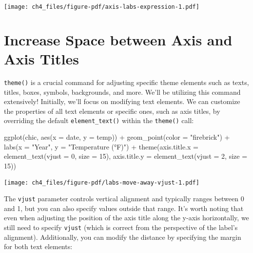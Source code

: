 \documentclass[
  letterpaper,
]{scrbook}
\newenvironment{Shaded}{\begin{snugshade}}{\end{snugshade}}
\newcommand{\AttributeTok}[1]{\textcolor[rgb]{0.40,0.45,0.13}{#1}}
\newcommand{\DecValTok}[1]{\textcolor[rgb]{0.68,0.00,0.00}{#1}}
\newcommand{\FunctionTok}[1]{\textcolor[rgb]{0.28,0.35,0.67}{#1}}
\newcommand{\NormalTok}[1]{\textcolor[rgb]{0.00,0.23,0.31}{#1}}
\newcommand{\SpecialCharTok}[1]{\textcolor[rgb]{0.37,0.37,0.37}{#1}}
\newcommand{\StringTok}[1]{\textcolor[rgb]{0.13,0.47,0.30}{#1}}
\begin{document}
\texttt{[image: ch4\_files/figure-pdf/axis-labs-expression-1.pdf]}

\section{Increase Space between Axis and Axis
Titles}\label{increase-space-between-axis-and-axis-titles}

\texttt{theme()} is a crucial command for adjusting specific theme
elements such as texts, titles, boxes, symbols, backgrounds, and more.
We'll be utilizing this command extensively! Initially, we'll focus on
modifying text elements. We can customize the properties of all text
elements or specific ones, such as axis titles, by overriding the
default \texttt{element\_text()} within the \texttt{theme()} call:

\begin{Shaded}
\begin{Highlighting}[]
\FunctionTok{ggplot}\NormalTok{(chic, }\FunctionTok{aes}\NormalTok{(}\AttributeTok{x =}\NormalTok{ date, }\AttributeTok{y =}\NormalTok{ temp)) }\SpecialCharTok{+}
  \FunctionTok{geom\_point}\NormalTok{(}\AttributeTok{color =} \StringTok{"firebrick"}\NormalTok{) }\SpecialCharTok{+}
  \FunctionTok{labs}\NormalTok{(}\AttributeTok{x =} \StringTok{"Year"}\NormalTok{, }\AttributeTok{y =} \StringTok{"Temperature (°F)"}\NormalTok{) }\SpecialCharTok{+}
  \FunctionTok{theme}\NormalTok{(}\AttributeTok{axis.title.x =} \FunctionTok{element\_text}\NormalTok{(}\AttributeTok{vjust =} \DecValTok{0}\NormalTok{, }\AttributeTok{size =} \DecValTok{15}\NormalTok{),}
        \AttributeTok{axis.title.y =} \FunctionTok{element\_text}\NormalTok{(}\AttributeTok{vjust =} \DecValTok{2}\NormalTok{, }\AttributeTok{size =} \DecValTok{15}\NormalTok{))}
\end{Highlighting}
\end{Shaded}

\texttt{[image: ch4\_files/figure-pdf/labs-move-away-vjust-1.pdf]}

The \texttt{vjust} parameter controls vertical alignment and typically
ranges between 0 and 1, but you can also specify values outside that
range. It's worth noting that even when adjusting the position of the
axis title along the y-axis horizontally, we still need to specify
\texttt{vjust} (which is correct from the perspective of the label's
alignment). Additionally, you can modify the distance by specifying the
margin for both text elements:
\end{document}
